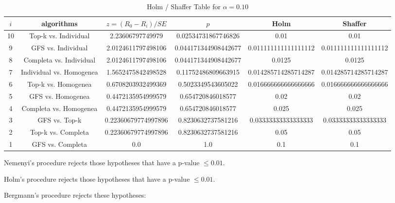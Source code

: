 \documentclass[a4paper,10pt]{article}
\begin{document}
\begin{landscape}
\begin{table}[!htp]
\centering\tiny
\caption{Holm / Shaffer Table for $\alpha=0.10$}
\begin{tabular}{cccccc}
$i$&algorithms&$z=(R_0 - R_i)/SE$&$p$&Holm&Shaffer\\
\hline
10&Top-k vs. Individual&2.23606797749979&0.02534731867746826&0.01&0.01\\
9&GFS vs. Individual&2.0124611797498106&0.044171344908442677&0.011111111111111112&0.011111111111111112\\
8&Completa vs. Individual&2.0124611797498106&0.044171344908442677&0.0125&0.0125\\
7&Individual vs. Homogenea&1.5652475842498528&0.11752486809663915&0.014285714285714287&0.014285714285714287\\
6&Top-k vs. Homogenea&0.6708203932499369&0.5023349543605022&0.016666666666666666&0.016666666666666666\\
5&GFS vs. Homogenea&0.4472135954999579&0.654720846018577&0.02&0.02\\
4&Completa vs. Homogenea&0.4472135954999579&0.654720846018577&0.025&0.025\\
3&GFS vs. Top-k&0.22360679774997896&0.8230632737581216&0.03333333333333333&0.03333333333333333\\
2&Top-k vs. Completa&0.22360679774997896&0.8230632737581216&0.05&0.05\\
1&GFS vs. Completa&0.0&1.0&0.1&0.1\\
\hline
\end{tabular}
\end{table}
Nemenyi's procedure rejects those hypotheses that have a p-value $\le0.01$.


Holm's procedure rejects those hypotheses that have a p-value $\le0.01$.


Bergmann's procedure rejects these hypotheses:


\begin{itemize}


\end{itemize}



\end{landscape}
\end{document}
